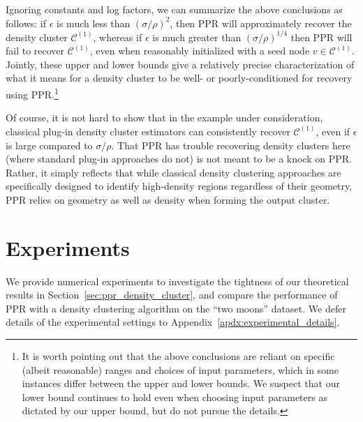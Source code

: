 \documentclass[11pt,twoside]{article}
\newcommand{\1}{\mathbf{1}}
\newcommand{\mc}[1]{\mathcal{#1}}
\begin{document}
Ignoring constants and log factors, we can summarize the above conclusions as follows: if $\epsilon$ is much less than $(\sigma/\rho)^2$, then PPR will approximately recover the density cluster $\mc{C}^{(1)}$, whereas if $\epsilon$ is much greater than $(\sigma/\rho)^{1/4}$ then PPR will fail to recover $\mc{C}^{(1)}$, even when reasonably initialized with a seed node $v \in \mc{C}^{(1)}$. Jointly, these upper and lower bounds give a relatively precise characterization of what it means for a density cluster to be well- or poorly-conditioned for recovery using PPR.\footnote{It is worth pointing out that the above conclusions are reliant on specific
(albeit reasonable) ranges and choices of input parameters, which in some
instances differ between the upper and lower bounds. We suspect that our lower
bound continues to hold even when choosing input parameters as dictated by our
upper bound, but do not pursue the details.}

Of course, it is not hard to show that in the example under consideration, classical
plug-in density cluster estimators can consistently recover $\mc{C}^{(1)}$, even if $\epsilon$ is
large compared to $\sigma/\rho$. That PPR has trouble recovering density
clusters here (where standard plug-in approaches do not) is not meant to
be a knock on PPR. Rather, it simply reflects that while classical density
clustering approaches are specifically designed to identify high-density regions
regardless of their geometry, PPR relies on geometry as well as density when
forming the output cluster. 

\section{Experiments}
\label{sec:experiments}
We provide numerical experiments to investigate the tightness of our theoretical results in Section~\ref{sec:ppr_density_cluster}, and compare the performance of PPR with a density clustering algorithm on the ``two moons'' dataset. We defer details of the experimental settings to Appendix~\ref{apdx:experimental_details}.   
\end{document}
